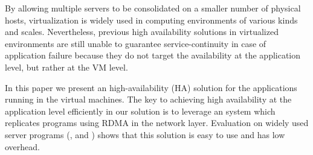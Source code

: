 By allowing multiple servers to be consolidated on a smaller number of physical 
hosts, virtualization is widely used in computing environments of various kinds and
scales. Nevertheless, previous high availability solutions in virtualized environments
are still unable to guarantee service-continuity in case of application failure because 
they do not target the availability at the application level, but rather at the VM level.

In this paper we present an high-availability (HA) solution for the applications running in 
the virtual machines. The key to achieving high availability at the application level efficiently
in our solution is to leverage an \smr system which replicates programs using RDMA in the network 
layer. Evaluation on \nprog widely used server programs (\eg, \mysql and \redis) shows that this 
solution is easy to use and has low overhead.
